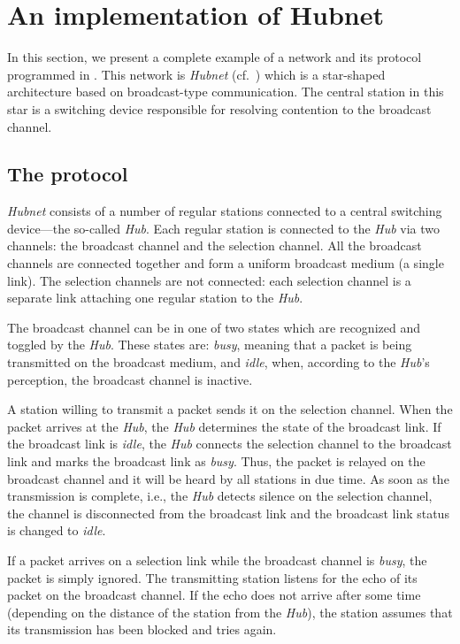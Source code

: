 \section{An implementation of Hubnet}

In this section, we present a complete example of a network and its
protocol programmed in \smurph.
This network is {\em Hubnet\/} (cf.\ 
\cite{htw86}) which is a star-shaped architecture based on broadcast-type
communication.
The central station in this star is a switching device responsible for
resolving contention to the broadcast channel.

\subsection{The protocol}

{\em Hubnet\/} consists of a number
of regular stations connected to a central
switching device---the so-called {\em Hub}.
Each regular station is connected to the {\em Hub} via
two channels: the broadcast channel and the selection channel.
All the broadcast channels are connected
together and 
form a uniform broadcast medium (a single link).
The selection channels are
not connected: each selection channel is a separate link attaching one
regular station to the {\em Hub}.

The broadcast channel can be in one of two states which are recognized and
toggled by the {\em Hub}.
These states are: {\em busy\/}, meaning that a packet is being transmitted
on the broadcast medium, and {\em idle\/}, when, according to the {\em Hub}'s
perception, the broadcast channel is inactive.

A station willing to
transmit a packet sends it on the selection channel.
When the packet arrives at the {\em Hub}, the {\em Hub} determines the state of the
broadcast link.
If the broadcast link
is {\em idle}, the {\em Hub} connects the selection channel to the broadcast link and
marks the broadcast link as {\em busy}.
Thus, the packet is relayed on the broadcast channel and it will be heard by all
stations in due time.
As soon as the transmission is complete, i.e.,
the {\em Hub} detects silence on the selection channel,
the channel is disconnected from the broadcast link and
the broadcast link status is changed to {\em idle}.

If a packet arrives on a selection link while the broadcast channel is
{\em busy}, the packet is simply ignored.
The transmitting
station listens for the echo of its packet on the broadcast channel.
If the echo does not arrive after some time (depending on the distance
of the station from the {\em Hub}), the station assumes that its transmission
has been blocked and tries again.

